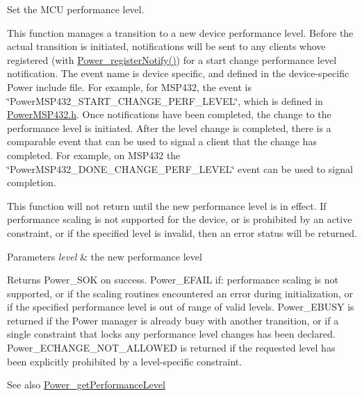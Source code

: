 Set the M\+C\+U performance level. 

This function manages a transition to a new device performance level. Before the actual transition is initiated, notifications will be sent to any clients who\textquotesingle{}ve registered (with \hyperlink{_power_8h_a8e73c431e3d1aab1a31181513ceb8adb}{Power\+\_\+register\+Notify()}) for a \textquotesingle{}start change performance level\textquotesingle{} notification. The event name is device specific, and defined in the device-\/specific Power include file. For example, for M\+S\+P432, the event is \char`\"{}\+Power\+M\+S\+P432\+\_\+\+S\+T\+A\+R\+T\+\_\+\+C\+H\+A\+N\+G\+E\+\_\+\+P\+E\+R\+F\+\_\+\+L\+E\+V\+E\+L\char`\"{}, which is defined in \hyperlink{_power_m_s_p432_8h}{Power\+M\+S\+P432.\+h}. Once notifications have been completed, the change to the performance level is initiated. After the level change is completed, there is a comparable event that can be used to signal a client that the change has completed. For example, on M\+S\+P432 the \char`\"{}\+Power\+M\+S\+P432\+\_\+\+D\+O\+N\+E\+\_\+\+C\+H\+A\+N\+G\+E\+\_\+\+P\+E\+R\+F\+\_\+\+L\+E\+V\+E\+L\char`\"{} event can be used to signal completion.

This function will not return until the new performance level is in effect. If performance scaling is not supported for the device, or is prohibited by an active constraint, or if the specified level is invalid, then an error status will be returned.


\begin{DoxyParams}{Parameters}
{\em level} & the new performance level\\
\hline
\end{DoxyParams}
\begin{DoxyReturn}{Returns}
Power\+\_\+\+S\+O\+K on success. Power\+\_\+\+E\+F\+A\+I\+L if\+: performance scaling is not supported, or if the scaling routines encountered an error during initialization, or if the specified performance level is out of range of valid levels. Power\+\_\+\+E\+B\+U\+S\+Y is returned if the Power manager is already busy with another transition, or if a single constraint that locks any performance level changes has been declared. Power\+\_\+\+E\+C\+H\+A\+N\+G\+E\+\_\+\+N\+O\+T\+\_\+\+A\+L\+L\+O\+W\+E\+D is returned if the requested level has been explicitly prohibited by a level-\/specific constraint.
\end{DoxyReturn}
\begin{DoxySeeAlso}{See also}
\hyperlink{_power_8h_a992dabafbcd2ed75308dd3e166d9e658}{Power\+\_\+get\+Performance\+Level} 
\end{DoxySeeAlso}
